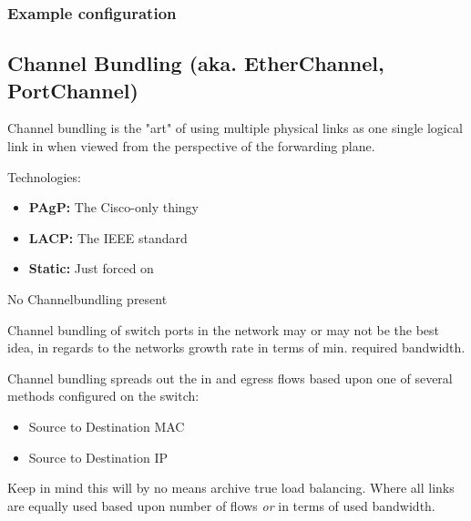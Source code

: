 \documentclass[a4paper,12pt,twoside,twocolumn]{book}
\begin{document}
\subsubsection{Example configuration}


\subsection{Channel Bundling (aka. EtherChannel, PortChannel)}
Channel bundling is the "art" of using multiple physical links as one single logical link in when viewed from the perspective of the forwarding plane.

Technologies:
\begin{itemize}
    \item \textbf{PAgP:} The Cisco-only thingy
    \item \textbf{LACP:} The IEEE standard
    \item \textbf{Static:} Just forced on
\end{itemize}

%
{No Channelbundling present}

Channel bundling of switch ports in the network may or may not be the best idea, in regards to the networks growth rate in terms of min. required bandwidth.

Channel bundling spreads out the in and egress flows based upon one of several methods configured on the switch:
\begin{itemize}
    \item Source to Destination MAC
    \item Source to Destination IP
\end{itemize}
Keep in mind this will by no means archive true load balancing. Where all links are equally used based upon number of flows \textit{or} in terms of used bandwidth.
\end{document}
